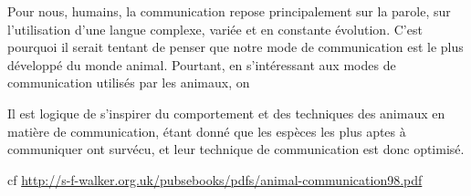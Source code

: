 Pour nous, humains, la communication repose principalement sur la
parole, sur l'utilisation d'une langue complexe, variée et en constante
évolution. C'est pourquoi il serait tentant de penser que notre mode de
communication est le plus développé du monde animal. Pourtant, en
s'intéressant aux modes de communication utilisés par les animaux, on

Il est logique de s'inspirer du comportement et des techniques des
animaux en matière de communication, étant donné que les espèces les
plus aptes à communiquer ont survécu, et leur technique de communication
est donc optimisé.

cf \url{http://s-f-walker.org.uk/pubsebooks/pdfs/animal-communication98.pdf}

